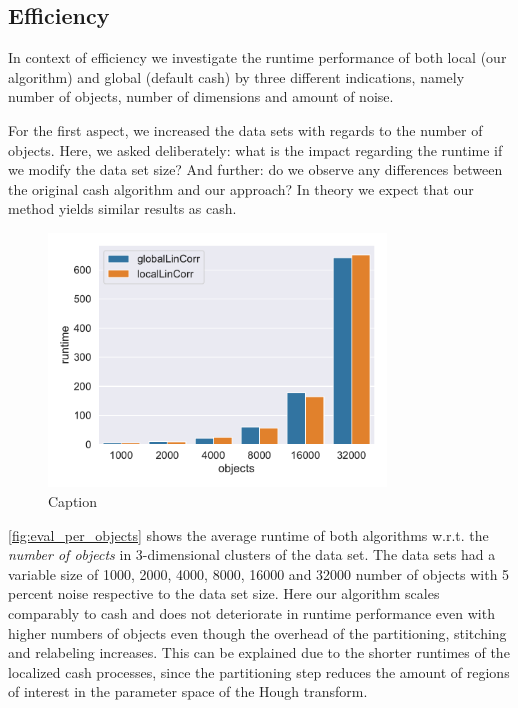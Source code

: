 \subsection{Efficiency}
In context of efficiency we investigate the runtime performance of both local (our algorithm) and global (default \gls{cash}) by three different indications, namely number of objects, number of dimensions and amount of noise.

For the first aspect, we increased the data sets with regards to the number of objects. Here, we asked deliberately: what is the impact regarding the runtime if we modify the data set size?
And further: do we observe any differences between the original \gls{cash} algorithm and our approach? In theory we expect that our method yields similar results as \gls{cash}.


\begin{figure}[h]
    \centering
    \includegraphics[width=0.8\textwidth]{evaluation/per_objects/Avg_Runtime_3D_N5_pobjects_bar.pdf}
    \caption{Caption}
    \label{fig:eval_per_objects}   
\end{figure}

\autoref{fig:eval_per_objects} shows the average runtime of both algorithms w.r.t. the \textit{number of objects} in 3-dimensional clusters of the data set. The data sets had a variable size of 1000, 2000, 4000, 8000, 16000 and 32000 number of objects with 5 percent noise respective to the data set size. Here our algorithm scales comparably to \gls{cash} and does not deteriorate in runtime performance even with higher numbers of objects even though the overhead of the partitioning, stitching and relabeling increases. This can be explained due to the shorter runtimes of the localized \gls{cash} processes, since the partitioning step reduces the amount of regions of interest in the parameter space of the Hough transform.\\

